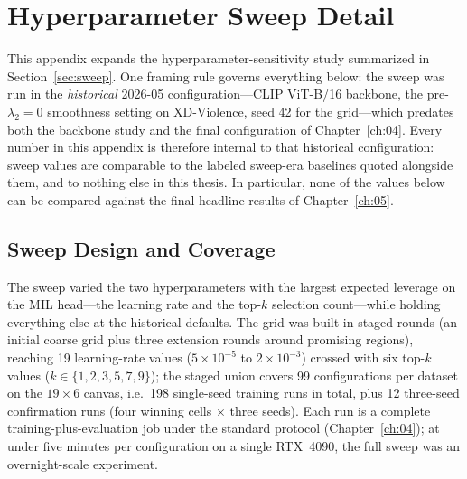 \chapter{Hyperparameter Sweep Detail}
\label{app:c}

This appendix expands the hyperparameter-sensitivity study summarized in
Section~\ref{sec:sweep}. One framing rule governs everything below: the
sweep was run in the \emph{historical} 2026-05 configuration---CLIP ViT-B/16
backbone, the pre-$\lambda_2{=}0$ smoothness setting on XD-Violence, seed 42
for the grid---which predates both the backbone study and the final
configuration of Chapter~\ref{ch:04}. Every number in this appendix is
therefore internal to that historical configuration: sweep values are
comparable to the labeled sweep-era baselines quoted alongside them, and to
nothing else in this thesis. In particular, none of the values below can be
compared against the final headline results of Chapter~\ref{ch:05}.

\section{Sweep Design and Coverage}
\label{sec:appc-design}

The sweep varied the two hyperparameters with the largest expected leverage
on the MIL head---the learning rate and the top-$k$ selection count---while
holding everything else at the historical defaults. The grid was built in
staged rounds (an initial coarse grid plus three extension rounds around
promising regions), reaching 19 learning-rate values
($5\times10^{-5}$ to $2\times10^{-3}$) crossed with six top-$k$ values
($k \in \{1, 2, 3, 5, 7, 9\}$); the staged union covers 99 configurations
per dataset on the $19\times6$ canvas, i.e.\ 198 single-seed training runs
in total, plus 12 three-seed confirmation runs (four winning cells $\times$
three seeds). Each run is a complete training-plus-evaluation job under the
standard protocol (Chapter~\ref{ch:04}); at under five minutes per
configuration on a single RTX~4090, the full sweep was an overnight-scale
experiment.

